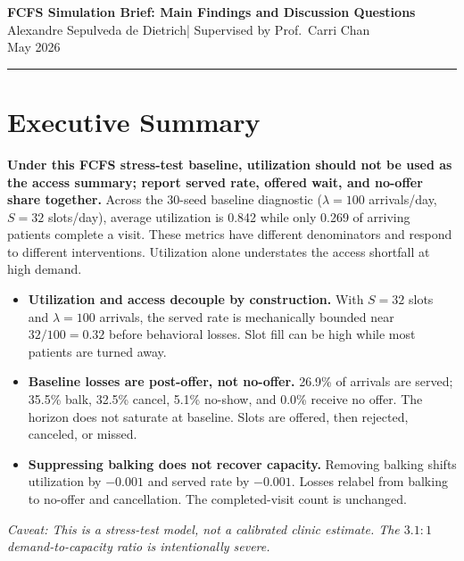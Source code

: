 \documentclass[10pt]{article}
\begin{document}
\begin{center}
  {\large\bfseries FCFS Simulation Brief: Main Findings and Discussion Questions}\\[3pt]
  Alexandre Sepulveda de Dietrich\quad|\quad
  Supervised by Prof.\ Carri Chan\\[2pt]
  {\small May 2026}
\end{center}
\vspace{2pt}
\noindent\rule{\textwidth}{0.5pt}
\vspace{2pt}

\section*{Executive Summary}

\begin{tcolorbox}[
  colback=gray!7,
  colframe=gray!45,
  boxrule=0.45pt,
  arc=2pt,
  left=8pt, right=8pt, top=6pt, bottom=6pt,
  parbox=true,
]
\textbf{Under this FCFS stress-test baseline, utilization should not be used as
the access summary; report served rate, offered wait, and no-offer share
together.}
Across the 30-seed baseline diagnostic (\(\lambda=100\) arrivals/day,
\(S=32\) slots/day), average utilization is 0.842 while only 0.269 of arriving
patients complete a visit. These metrics have different denominators and respond
to different interventions. Utilization alone understates the access shortfall
at high demand.

\vspace{4pt}
\begin{itemize}
  \item \textbf{Utilization and access decouple by construction.}
    With \(S=32\) slots and \(\lambda=100\) arrivals, the served rate is
    mechanically bounded near \(32/100=0.32\) before behavioral losses.
    Slot fill can be high while most patients are turned away.
  \item \textbf{Baseline losses are post-offer, not no-offer.}
    26.9\% of arrivals are served; 35.5\% balk, 32.5\% cancel, 5.1\%
    no-show, and 0.0\% receive no offer. The horizon does not saturate
    at baseline. Slots are offered, then rejected, canceled, or missed.
  \item \textbf{Suppressing balking does not recover capacity.}
    Removing balking shifts utilization by \(-0.001\) and served rate by
    \(-0.001\). Losses relabel from balking to no-offer and cancellation.
    The completed-visit count is unchanged.
\end{itemize}

\vspace{3pt}
\textit{Caveat: This is a stress-test model, not a calibrated clinic estimate.
The \(3.1:1\) demand-to-capacity ratio is intentionally severe.}
\end{tcolorbox}
\end{document}
